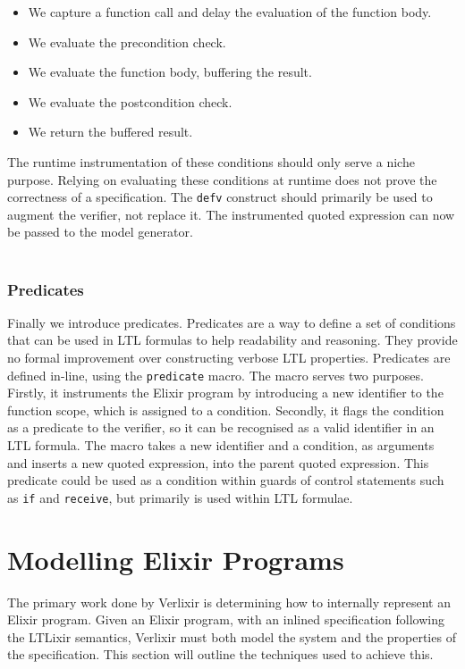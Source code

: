\begin{itemize}
    \item We capture a function call and delay the evaluation of the function body.
    \item We evaluate the precondition check.
    \item We evaluate the function body, buffering the result.
    \item We evaluate the postcondition check.
    \item We return the buffered result.
\end{itemize}
The runtime instrumentation of these conditions should only serve a niche purpose. Relying on evaluating these conditions at runtime does not prove the correctness of a specification. The \texttt{defv} construct should primarily be used to augment the verifier, not replace it. The instrumented quoted expression can now be passed to the model generator.
\\ \\
\subsubsection{Predicates}
Finally we introduce predicates. Predicates are a way to define a set of conditions that can be used in LTL formulas to help readability and reasoning. They provide no formal improvement over constructing verbose LTL properties. Predicates are defined in-line, using the \texttt{predicate} macro. The macro serves two purposes. Firstly, it instruments the Elixir program by introducing a new identifier to the function scope, which is assigned to a condition. Secondly, it flags the condition as a predicate to the verifier, so it can be recognised as a valid identifier in an LTL formula. The macro takes a new identifier and a condition, as arguments and inserts a new quoted expression, into the parent quoted expression. This predicate could be used as a condition within guards of control statements such as \texttt{if} and \texttt{receive}, but primarily is used within LTL formulae.

\section{Modelling Elixir Programs} \label{sec:modelling_elixir_programs}
The primary work done by Verlixir is determining how to internally represent an Elixir program. Given an Elixir program, with an inlined specification following the LTLixir semantics, Verlixir must both model the system and the properties of the specification. This section will outline the techniques used to achieve this.

